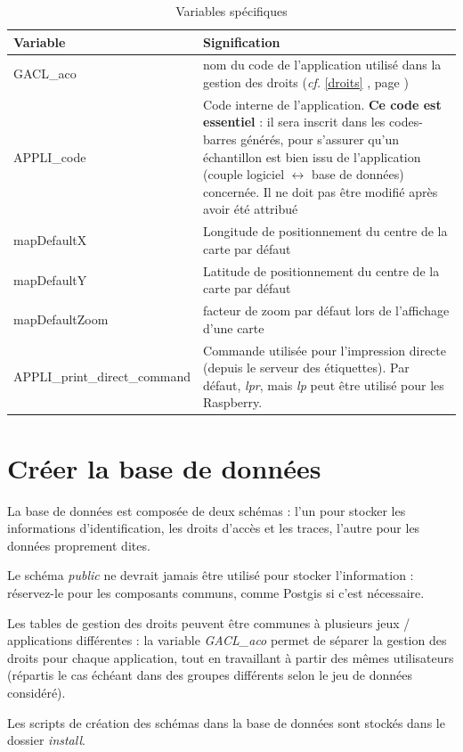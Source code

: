 \begin{longtable}{|p{4cm}|p{11cm}|}
\hline
\textbf{Variable} & \textbf{Signification} \\
\hline
\endhead
GACL\_aco & nom du code de l'application utilisé dans la gestion des droits (\textit{cf.} \ref{droits} \textit{\nameref{droits}}, page \pageref{droits} )\\
\hline
APPLI\_code & Code interne de l'application. \textbf{Ce code est essentiel} : il sera inscrit dans les codes-barres générés, pour s'assurer qu'un échantillon est bien issu de l'application (couple logiciel $\leftrightarrow$ base de données) concernée. Il ne doit pas être modifié après avoir été attribué\\
\hline
mapDefaultX & Longitude de positionnement du centre de la carte par défaut \\
\hline
mapDefaultY & Latitude de positionnement du centre de la carte par défaut \\
\hline
mapDefaultZoom & facteur de zoom par défaut lors de l'affichage d'une carte \\
\hline
APPLI\_print\_direct\_command & Commande utilisée pour l'impression directe (depuis le serveur des étiquettes). Par défaut, \textit{lpr}, mais \textit{lp} peut être utilisé pour les Raspberry.
\hline
\caption{Variables spécifiques}
\end{longtable}

\section{Créer la base de données}

La base de données est composée de deux schémas : l'un pour stocker les informations d'identification, les droits d'accès et les traces, l'autre pour les données proprement dites.

Le schéma \textit{public} ne devrait jamais être utilisé pour stocker l'information : réservez-le pour les composants communs, comme Postgis si c'est nécessaire.

Les tables de gestion des droits peuvent être communes à plusieurs jeux / applications différentes : la variable \textit{GACL\_aco} permet de séparer la gestion des droits pour chaque application, tout en travaillant à partir des mêmes utilisateurs (répartis le cas échéant dans des groupes différents selon le jeu de données considéré).

Les scripts de création des schémas dans la base de données sont stockés dans le dossier \textit{install}. 



